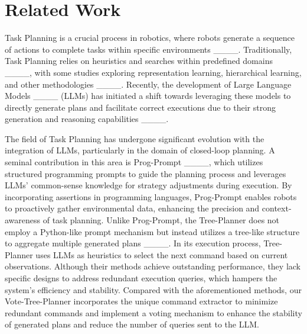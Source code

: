 \section{Related Work}
Task Planning is a crucial process in robotics, where robots generate a sequence of actions to complete tasks within specific environments ____. Traditionally, Task Planning relies on heuristics and searches within predefined domains ____, with some studies exploring representation learning, hierarchical learning, and other methodologies ____. Recently, the development of Large Language Models ____ (LLMs) has initiated a shift towards leveraging these models to directly generate plans and facilitate correct executions due to their strong generation and reasoning capabilities ____.

The field of Task Planning has undergone significant evolution with the integration of LLMs, particularly in the domain of closed-loop planning. A seminal contribution in this area is Prog-Prompt ____, which utilizes structured programming prompts to guide the planning process and leverages LLMs' common-sense knowledge for strategy adjustments during execution. By incorporating assertions in programming languages, Prog-Prompt enables robots to proactively gather environmental data, enhancing the precision and context-awareness of task planning. Unlike Prog-Prompt, the Tree-Planner does not employ a Python-like prompt mechanism but instead utilizes a tree-like structure to aggregate multiple generated plans ____. In its execution process, Tree-Planner uses LLMs as heuristics to select the next command based on current observations. Although their methods achieve outstanding performance, they lack specific designs to address redundant execution queries, which hampers the system's efficiency and stability. Compared with the aforementioned methods, our Vote-Tree-Planner incorporates the unique command extractor to minimize redundant commands and implement a voting mechanism to enhance the stability of generated plans and reduce the number of queries sent to the LLM.
